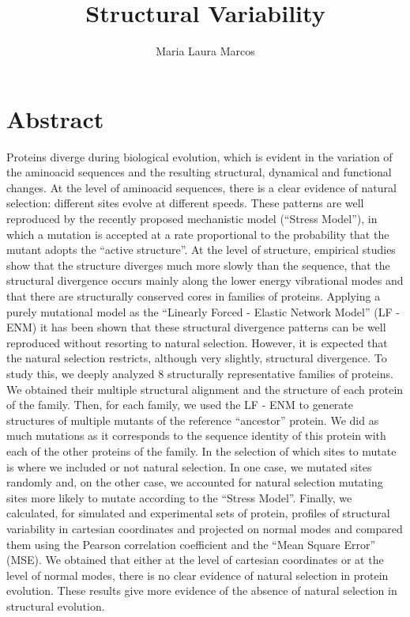 \documentclass{article}
\title{Structural Variability}
\author{Maria Laura Marcos}
\begin{document}
\maketitle

\section{Abstract}
Proteins diverge during biological evolution, which is evident in the variation of the aminoacid sequences and the resulting structural, dynamical and functional changes. At the level of aminoacid sequences, there is a clear evidence of natural selection: different sites evolve at different speeds. These patterns are well reproduced by the recently proposed mechanistic model (``Stress Model''), in which a mutation is accepted at a rate proportional to the probability that the mutant adopts the ``active structure''. At the level of structure, empirical studies show that the structure diverges much more slowly than the sequence, that the structural divergence occurs mainly along the lower energy vibrational modes and that there are structurally conserved cores in families of proteins. Applying a purely mutational model as the ``Linearly Forced - Elastic Network Model'' (LF - ENM) it has been shown that these structural divergence patterns can be well reproduced without resorting to natural selection. However, it is expected that the natural selection restricts, although very slightly, structural divergence. To study this, we deeply analyzed 8 structurally representative families of proteins. We obtained their multiple structural alignment and the structure of each protein of the family. Then, for each family, we used the LF - ENM to generate structures of multiple mutants of the reference ``ancestor'' protein. We did as much mutations as it corresponds to the sequence identity of this protein with each of the other proteins of the family. In the selection of which sites to mutate is where we included or not natural selection. In one case, we mutated sites randomly and, on the other case, we accounted for natural selection mutating sites more likely to mutate according to the ``Stress Model''. Finally, we calculated, for simulated and experimental sets of protein, profiles of structural variability in cartesian coordinates and projected on normal modes and compared them using the Pearson correlation coefficient and the ``Mean Square Error'' (MSE). We obtained that either at the level of cartesian coordinates or at the level of normal modes, there is no clear evidence of natural selection in protein evolution. These results give more evidence of the absence of natural selection in structural evolution.
\end{document}
